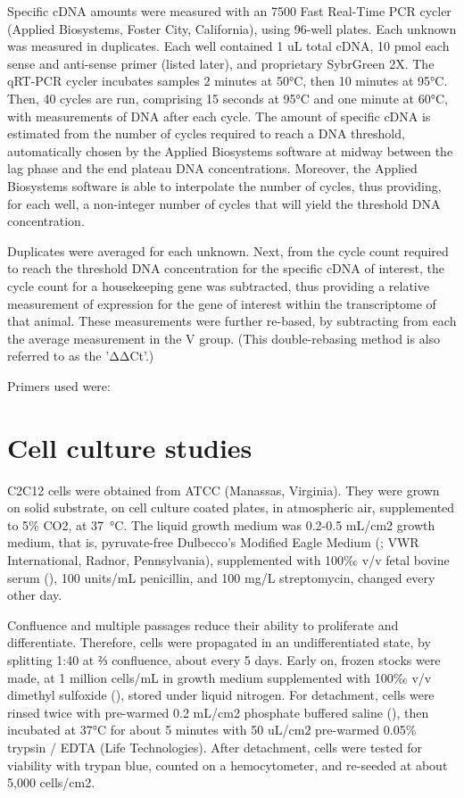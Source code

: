 \documentclass[12pt,english]{report}\usepackage[]{graphicx}\usepackage[]{color}
\begin{document}
Specific cDNA amounts were measured with an 7500 Fast Real-Time PCR
cycler (Applied Biosystems, Foster City, California), using 96-well
plates. Each unknown was measured in duplicates. Each well contained
1 uL total cDNA, 10 pmol each sense and anti-sense primer (listed
later), and proprietary SybrGreen 2X. The qRT-PCR cycler incubates
samples 2 minutes at 50°C, then 10 minutes at 95°C. Then, 40 cycles
are run, comprising 15 seconds at 95°C and one minute at 60°C, with
measurements of DNA after each cycle. The amount of specific cDNA
is estimated from the number of cycles required to reach a DNA threshold,
automatically chosen by the Applied Biosystems software at midway
between the lag phase and the end plateau DNA concentrations. Moreover,
the Applied Biosystems software is able to interpolate the number
of cycles, thus providing, for each well, a non-integer number of
cycles that will yield the threshold DNA concentration.

Duplicates were averaged for each unknown. Next, from the cycle count
required to reach the threshold DNA concentration for the specific
cDNA of interest, the cycle count for a housekeeping gene was subtracted,
thus providing a relative measurement of expression for the gene of
interest within the transcriptome of that animal. These measurements
were further re-based, by subtracting from each the average measurement
in the V group. (This double-rebasing method is also referred to as
the 'ΔΔCt'.)

Primers used were:


\section{Cell culture studies}

C2C12 cells were obtained from ATCC (Manassas, Virginia). They were
grown on solid substrate, on cell culture coated plates, in atmospheric
air, supplemented to 5\% CO2, at \SI{37}{\celsius}. The liquid growth
medium was 0.2-0.5 mL/cm2 growth medium, that is, pyruvate-free Dulbecco's
Modified Eagle Medium (;
VWR International, Radnor, Pennsylvania), supplemented with 100‰ v/v
fetal bovine serum (), 100
units/mL penicillin, and 100 mg/L streptomycin, changed every other
day.

Confluence and multiple passages reduce their ability to proliferate
and differentiate. Therefore, cells were propagated in an undifferentiated
state, by splitting 1:40 at ⅔ confluence, about every 5 days. Early
on, frozen stocks were made, at 1 million cells/mL in growth medium
supplemented with 100‰ v/v dimethyl sulfoxide (),
stored under liquid nitrogen. For detachment, cells were rinsed twice
with pre-warmed 0.2 mL/cm2 phosphate buffered saline (),
then incubated at 37°C for about 5 minutes with 50 uL/cm2 pre-warmed
0.05\% trypsin / EDTA (Life Technologies). After detachment, cells
were tested for viability with trypan blue, counted on a hemocytometer,
and re-seeded at about 5,000 cells/cm2.
\end{document}
